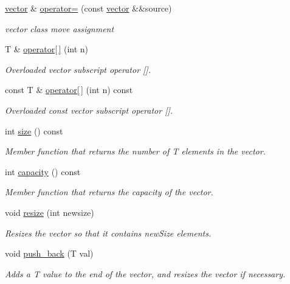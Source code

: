\begin{DoxyCompactItemize}
\mbox{\hyperlink{classproject_1_1vector}{vector}} \& \mbox{\hyperlink{classproject_1_1vector_aadeeb218c94243fed0d8c6c14f1ac62d}{operator=}} (const \mbox{\hyperlink{classproject_1_1vector}{vector}} \&\&source)
\begin{DoxyCompactList}\small\item\em vector class move assignment \end{DoxyCompactList}\item 
T \& \mbox{\hyperlink{classproject_1_1vector_a24d62308b10b6cd2712964d0ac9597dd}{operator\mbox{[}$\,$\mbox{]}}} (int n)
\begin{DoxyCompactList}\small\item\em Overloaded vector subscript operator \mbox{[}\mbox{]}. \end{DoxyCompactList}\item 
const T \& \mbox{\hyperlink{classproject_1_1vector_ab75b6014a2b266c0b5e13b64efebcf7e}{operator\mbox{[}$\,$\mbox{]}}} (int n) const
\begin{DoxyCompactList}\small\item\em Overloaded const vector subscript operator \mbox{[}\mbox{]}. \end{DoxyCompactList}\item 
int \mbox{\hyperlink{classproject_1_1vector_ac7e1b54fa8a66be408bd42cb60840084}{size}} () const
\begin{DoxyCompactList}\small\item\em Member function that returns the number of T elements in the vector. \end{DoxyCompactList}\item 
int \mbox{\hyperlink{classproject_1_1vector_a58b02d28811d347a6d0eed40a1d5614b}{capacity}} () const
\begin{DoxyCompactList}\small\item\em Member function that returns the capacity of the vector. \end{DoxyCompactList}\item 
void \mbox{\hyperlink{classproject_1_1vector_a48ef25366c7155a905a0f2d4fa97f4fa}{resize}} (int newsize)
\begin{DoxyCompactList}\small\item\em Resizes the vector so that it contains new\+Size elements. \end{DoxyCompactList}\item 
void \mbox{\hyperlink{classproject_1_1vector_a0663a56a33c99d3117ab2361f8544507}{push\+\_\+back}} (T val)
\begin{DoxyCompactList}\small\item\em Adds a T value to the end of the vector, and resizes the vector if necessary. \end{DoxyCompactList}\item 

\end{DoxyCompactItemize}
